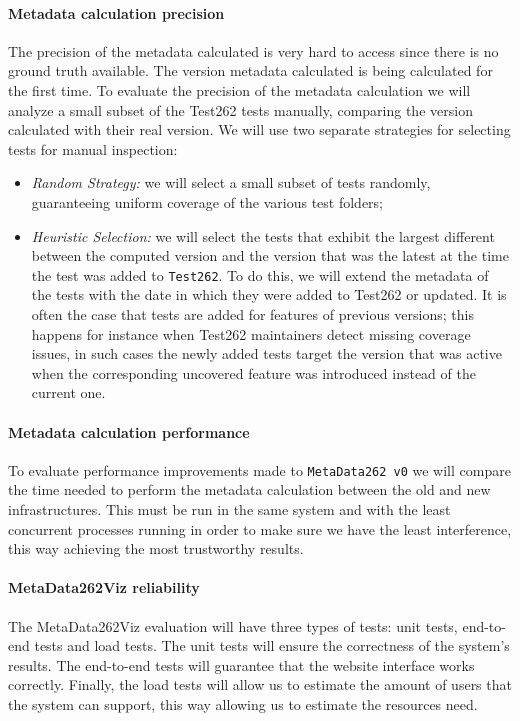 \documentclass[runningheads]{llncs}
\begin{document}
\paragraph{Metadata calculation precision}
The precision of the metadata calculated is very hard to access since there is no ground truth available. The version metadata calculated is being calculated for the first time. To evaluate the precision of the metadata calculation we will analyze a small subset of the Test262 tests manually, comparing the version calculated with their real version. We will use two separate strategies for selecting tests for manual inspection:
\begin{itemize}
\item \emph{Random Strategy:} we will select a small subset of tests randomly, guaranteeing uniform coverage of the various test folders;
%
\item \emph{Heuristic Selection:} we will select the tests that exhibit the largest different between the computed version and the version that was the latest at the time the test was added to \texttt{Test262}. To do this, we will extend the metadata of the tests with the date in which they were added to Test262 or updated. It is often the case that tests are added for features of previous versions; this happens for instance when Test262 maintainers detect missing coverage issues, in such cases the newly added tests target the version that was active when the corresponding uncovered feature was introduced instead of the current one.
\end{itemize}


\paragraph{Metadata calculation performance}
To evaluate performance improvements made to \texttt{MetaData262 v0} we will compare the time needed to perform the metadata calculation between the old and new infrastructures. This must be run in the same system and with the least concurrent processes running in order to make sure we have the least interference, this way achieving the most trustworthy results.



\paragraph{MetaData262Viz reliability}
The MetaData262Viz evaluation will have three types of tests: unit tests, end-to-end tests and load tests. The unit tests will ensure the correctness of the system's results. The end-to-end tests will guarantee that the website interface works correctly. Finally, the load tests will allow us to estimate the amount of users that the system can support, this way allowing us to estimate the resources need.
\end{document}
